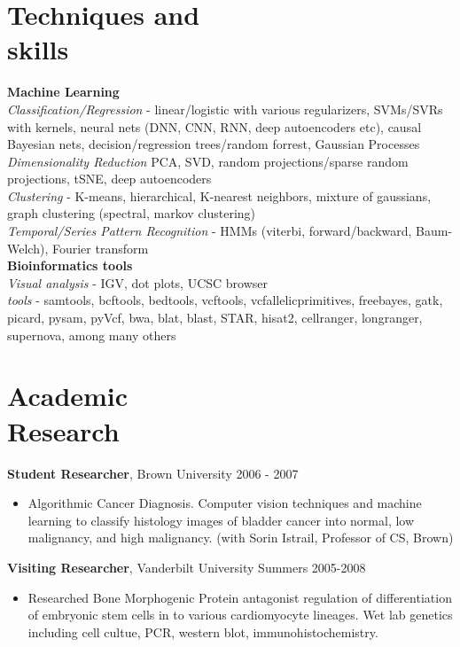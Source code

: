 \documentclass[margin]{res}
\begin{document}
\begin{resume}
\section{Techniques and \\ skills}
{\bf Machine Learning} \\
\emph{Classification/Regression} - linear/logistic with various regularizers, SVMs/SVRs with kernels, neural nets (DNN, CNN, RNN, deep autoencoders etc), causal Bayesian nets, decision/regression trees/random forrest, Gaussian Processes \\
\emph{Dimensionality Reduction} PCA, SVD, random projections/sparse random projections, tSNE, deep autoencoders \\
\emph{Clustering} - K-means, hierarchical, K-nearest neighbors, mixture of gaussians, graph clustering (spectral, markov clustering) \\
\emph{Temporal/Series Pattern Recognition} - HMMs (viterbi, forward/backward, Baum-Welch), Fourier transform \\
{\bf Bioinformatics tools} \\
\emph{Visual analysis} - IGV, dot plots, UCSC browser \\
\emph{tools} - samtools, bcftools, bedtools, vcftools, vcfallelicprimitives, freebayes, gatk, picard, pysam, pyVcf, bwa, blat, blast, STAR, hisat2, cellranger, longranger, supernova, among many others 

\section{Academic \\Research}
{\bf Student Researcher}, Brown University \hfill 2006 - 2007 
\begin{itemize}
\item Algorithmic Cancer Diagnosis. Computer vision techniques and machine learning to classify histology images of bladder cancer into normal, low malignancy, and high malignancy. (with Sorin Istrail, Professor of CS, Brown)
\end{itemize}
{\bf Visiting Researcher}, Vanderbilt University \hfill Summers 2005-2008 
\begin{itemize}
\item Researched Bone Morphogenic Protein antagonist regulation of differentiation of embryonic stem cells in to various cardiomyocyte lineages. Wet lab genetics including cell cultue, PCR, western blot, immunohistochemistry.
\end{itemize}



\end{resume}
\end{document}
